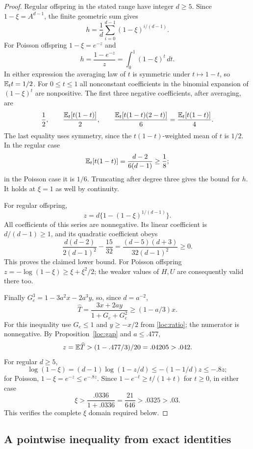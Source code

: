 \begin{proof}
Regular offspring in the stated range have integer $d\ge5$.
Since $1-\xi=A^{d-1}$, the finite geometric sum gives
\[
 h=\frac1d\sum_{i=0}^{d-1}(1-\xi)^{i/(d-1)}.
\]
For Poisson offspring $1-\xi=e^{-z}$ and
\[
 h=\frac{1-e^{-z}}z=\int_0^1(1-\xi)^t\,dt.
\]
In either expression the averaging law of $t$ is symmetric under
$t\mapsto1-t$, so $\mathbb E_t t=1/2$.  For $0\le t\le1$ all
nonconstant coefficients in the binomial expansion of $(1-\xi)^t$
are nonpositive.  The first three negative coefficients, after
averaging, are
\[
 \frac12,\qquad \frac{\mathbb E_t[t(1-t)]}{2},\qquad
 \frac{\mathbb E_t[t(1-t)(2-t)]}{6}
       =\frac{\mathbb E_t[t(1-t)]}{4}.
\]
The last equality uses symmetry, since the $t(1-t)$-weighted mean
of $t$ is $1/2$.  In the regular case
\[
 \mathbb E_t[t(1-t)]=\frac{d-2}{6(d-1)}\ge\frac18;
\]
in the Poisson case it is $1/6$.  Truncating after degree three gives
the bound for $h$.  It holds at $\xi=1$ as well by continuity.

For regular offspring,
\[
 z=d\{1-(1-\xi)^{1/(d-1)}\}.
\]
All coefficients of this series are nonnegative.  Its linear
coefficient is $d/(d-1)\ge1$, and its quadratic coefficient obeys
\[
 \frac{d(d-2)}{2(d-1)^2}-\frac{15}{32}
       =\frac{(d-5)(d+3)}{32(d-1)^2}\ge0.
\]
This proves the claimed lower bound.  For Poisson offspring
$z=-\log(1-\xi)\ge\xi+\xi^2/2$; the weaker values of $H,U$
are consequently valid there too.

Finally
$G_e^3=1-3a^2x-2a^3y$, so, since $d=a^{-2}$,
\begin{equation}\label{wei:That}
 \widehat T=\frac{3x+2ay}{1+G_e+G_e^2}
       \ge(1-a/3)x.
\end{equation}
For this inequality use $G_e\le1$ and $y\ge-x/2$ from
\eqref{loc:ratio}; the numerator is nonnegative.  By
Proposition~\ref{loc:gap} and $a\le.477$,
\[
 z=\mathbb E\widehat T>(1-.477/3)/20=.04205>.042.
\]
For regular $d\ge5$,
\[
 \log(1-\xi)=(d-1)\log(1-z/d)\le-(1-1/d)z\le-.8z;
\]
for Poisson, $1-\xi=e^{-z}\le e^{-.8z}$.
Since $1-e^{-t}\ge t/(1+t)$ for $t\ge0$, in either case
\[
 \xi>\frac{.0336}{1+.0336}=\frac{21}{646}>.0325>.03.
\]
This verifies the complete $\xi$ domain required below.
\end{proof}

\subsection{A pointwise inequality from exact identities}

